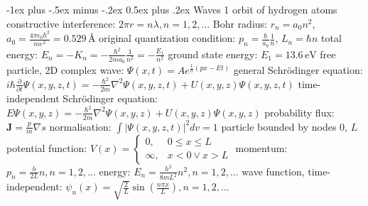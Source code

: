 \documentclass[10pt,landscape]{article}
\makeatletter
\renewcommand{\subsection}{\@startsection{subsection}{2}{0mm}%
                                {-1ex plus -.5ex minus -.2ex}%
                                {0.5ex plus .2ex}%
                                {\normalfont\normalsize\bfseries}}
\newcommand{\spc}{\hspace*{1em}}
\makeatother
\begin{document}
\begin{multicols*}{3}
\subsection{Waves 1}
orbit of hydrogen atoms
\newline
\spc constructive interference: $2\pi r=n\lambda,n=1,2,...$
\newline
\spc Bohr radius: $r_n=a_0n^2$, $a_0=\frac{4\pi\epsilon_0\hbar^2}{me^2}=0.529\,\textrm{\AA }$
\newline
\spc original quantization condition: $p_n=\frac{\hbar}{a_0}\frac{1}{n}$,  $L_n=\hbar n$
\newline
\spc total energy: $E_n=-K_n=-\frac{\hbar^2}{2ma_0}\frac{1}{n^2}=-\frac{E_1}{n^2}$
\newline
\spc ground state energy: $E_1=13.6\,\textrm{eV}$
\newline \newline
free particle, 2D complex wave: $\Psi(x,t)=Ae^{\frac{1}{\hbar}(px-Et)}$
\newline
\newline
general Schrödinger equation:
\newline
\spc $i\hbar \frac{\partial}{\partial t}\Psi(x,y,z,t)=-\frac{\hbar^2}{2m}\nabla^2\Psi(x,y,z,t)+U(x,y,z)\Psi(x,y,z,t)$
\newline
time-independent Schrödinger equation:
\newline
\spc $E\Psi(x,y,z)=-\frac{\hbar^2}{2m}\nabla^2\Psi(x,y,z)+U(x,y,z)\Psi(x,y,z)$
\newline
probability flux: $\mathbf{J}=\frac{p}{m}\nabla s$
\newline
normalisation: $\int |\Psi(x,y,z,t)|^2dv=1$
\newline \newline
particle bounded by nodes $0$, $L$
\newline
\spc potential function: $V(x)=\left\{\begin{matrix}
0,&0\leq x\leq L\\ \infty,&x<0\vee x>L 
\end{matrix}\right.$
\newline
\spc momentum: $p_n=\frac{h}{2L}n,n=1,2,...$
\newline
\spc energy: $E_n=\frac{h^2}{8mL^2}n^2,n=1,2,...$
\newline
\spc wave function, time-independent:
\newline
\spc \spc $\psi_n(x)=\sqrt{\frac{2}{L}}\sin(\frac{n\pi x}{L}),n=1,2,...$
\newline\newline

\end{multicols*}
\end{document}
